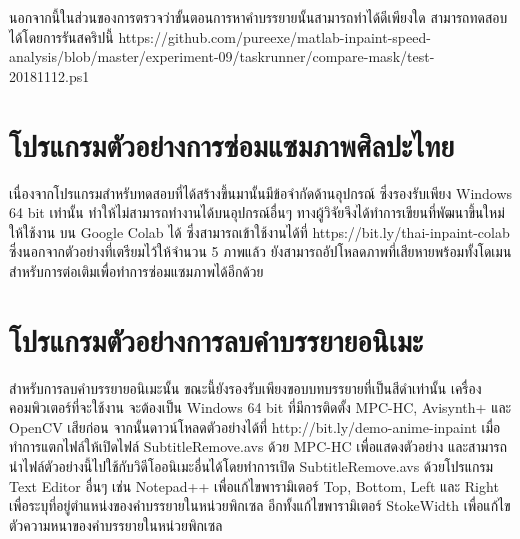 \hspace{1cm} นอกจากนี้ในส่วนของการตรวจว่าขั้นตอนการหาคำบรรยายนั้นสามารถทำได้ดีเพียงใด สามารถทดสอบได้โดยการรันสคริปนี้ https://github.com/pureexe/matlab-inpaint-speed-analysis/blob/master/experiment-09/taskrunner/compare-mask/test-20181112.ps1




\section{โปรแกรมตัวอย่างการซ่อมแซมภาพศิลปะไทย}
\hspace{1cm} เนื่องจากโปรแกรมสำหรับทดสอบที่ได้สร้างขึ้นมานั้นมีข้อจำกัดด้านอุปกรณ์ ซึ่งรองรับเพียง Windows 64 bit เท่านั้น ทำให้ไม่สามารถทำงานได้บนอุปกรณ์อื่นๆ ทางผู้วิจัยจึงได้ทำการเขียนที่พัฒนาขึ้นใหม่ให้ใช้งาน บน Google Colab ได้ ซึ่งสามารถเข้าใช้งานได้ที่ https://bit.ly/thai-inpaint-colab ซึ่งนอกจากตัวอย่างที่เตรียมไว้ให้จำนวน 5 ภาพแล้ว ยังสามารถอัปโหลดภาพที่เสียหายพร้อมทั้งโดเมนสำหรับการต่อเติมเพื่อทำการซ่อมแซมภาพได้อีกด้วย





\section{โปรแกรมตัวอย่างการลบคำบรรยายอนิเมะ}
\hspace{1cm} สำหรับการลบคำบรรยายอนิเมะนั้น ขณะนี้ยังรองรับเพียงขอบบทบรรยายที่เป็นสีดำเท่านั้น เครื่องคอมพิวเตอร์ที่จะใช้งาน จะต้องเป็น Windows 64 bit ที่มีการติดตั้ง MPC-HC, Avisynth+ และ OpenCV เสียก่อน จากนั้นดาวน์โหลดตัวอย่างได้ที่ http://bit.ly/demo-anime-inpaint เมื่อทำการแตกไฟล์ให้เปิดไฟล์ SubtitleRemove.avs ด้วย MPC-HC เพื่อแสดงตัวอย่าง และสามารถนำไฟล์ตัวอย่างนี้ไปใช้กับวิดีโออนิเมะอื่นได้โดยทำการเปิด SubtitleRemove.avs ด้วยโปรแกรม Text Editor อื่นๆ เช่น Notepad++ เพื่อแก้ไขพารามิเตอร์ Top, Bottom, Left และ Right เพื่อระบุที่อยู่ตำแหน่งของคำบรรยายในหน่วยพิกเซล อีกทั้งแก้ไขพารามิเตอร์ StokeWidth เพื่อแก้ไขตัวความหนาของคำบรรยายในหน่วยพิกเซล



